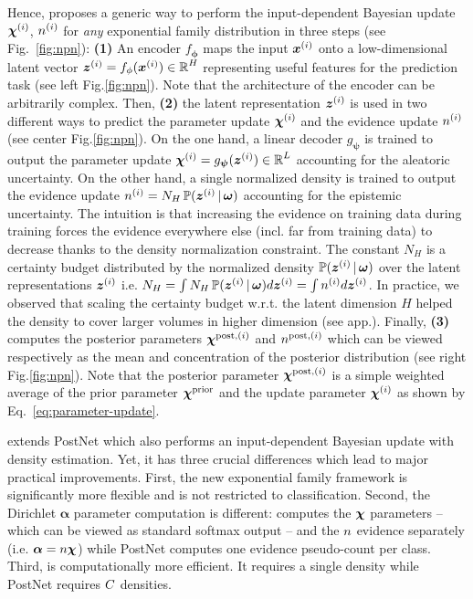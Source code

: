 Hence, \NatPNacro{} proposes a generic way to perform the input-dependent Bayesian update $\bm{\chi}^{(i)}$, $n^{(i)}$ for \emph{any} exponential family distribution in three steps (see Fig.~\ref{fig:npn}): \textbf{(1)} An encoder $f_{\bm{\phi}}$ maps the input $\bm{x}^{(i)}$ onto a low-dimensional latent vector $\bm{z}^{(i)} = f_{\phi}(\bm{x}^{(i)}) \in \operatorname{\mathbb{R}}^H$ representing useful features for the prediction task (see left Fig.\ref{fig:npn}). Note that the architecture of the encoder can be arbitrarily complex. Then, \textbf{(2)} the latent representation $\bm{z}^{(i)}$ is used in two different ways to predict the parameter update $\bm{\chi}^{(i)}$ and the evidence update $n^{(i)}$ (see center Fig.\ref{fig:npn}). On the one hand, a linear decoder $g_{\bm{\psi}}$ is trained to output the parameter update $\bm{\chi}^{(i)} = g_{\bm{\psi}}(\bm{z}^{(i)}) \in \operatorname{\mathbb{R}}^L$ accounting for the aleatoric uncertainty. On the other hand, a single normalized density is trained to output the evidence update $n^{(i)} = N_H\operatorname{\mathbb{P}}(\bm{z}^{(i)} \,|\, \bm{\omega})$ accounting for the epistemic uncertainty. The intuition is that increasing the evidence on training data during training forces the evidence everywhere else (incl. far from training data) to decrease thanks to the density normalization constraint. The constant $N_H$ is a certainty budget distributed by the normalized density $\operatorname{\mathbb{P}}(\bm{z}^{(i)} \,|\, \bm{\omega})$ over the latent representations $\bm{z}^{(i)}$ i.e. $N_H = \int N_H \operatorname{\mathbb{P}}(\bm{z}^{(i)} \,|\, \bm{\omega}) d\bm{z}^{(i)} = \int n^{(i)} d\bm{z}^{(i)}$. In practice, we observed that scaling the certainty budget w.r.t. the latent dimension $H$ helped the density to cover larger volumes in higher dimension (see app.). Finally, \textbf{(3)} \NatPNacro{} computes the posterior parameters $\bm{\chi}^{\text{post}, (i)}$ and $n^{\text{post}, (i)}$ which can be viewed respectively as the mean and concentration of the posterior distribution (see right Fig.\ref{fig:npn}). Note that the posterior parameter $\bm{\chi}^{\text{post}, (i)}$ is a simple weighted average of the prior parameter $\bm{\chi}^\text{prior}$ and the update parameter $\bm{\chi}^{(i)}$ as shown by Eq.~\ref{eq:parameter-update}.

\NatPNacro{} extends PostNet \citep{postnet} which also performs an input-dependent Bayesian update with density estimation. Yet, it has three crucial differences which lead to major practical improvements. First, the new exponential family framework is significantly more flexible and is not restricted to classification. Second, the Dirichlet $\bm{\alpha}$ parameter computation is different: \NatPNacro{} computes the $\bm{\chi}$ parameters -- which can be viewed as standard softmax output -- and the $n$ evidence separately (i.e. $\bm{\alpha} = n \bm{\chi}$) while PostNet computes one evidence pseudo-count per class. Third, \NatPNacro{} is computationally more efficient. It requires a single density while PostNet requires $C$ densities.

